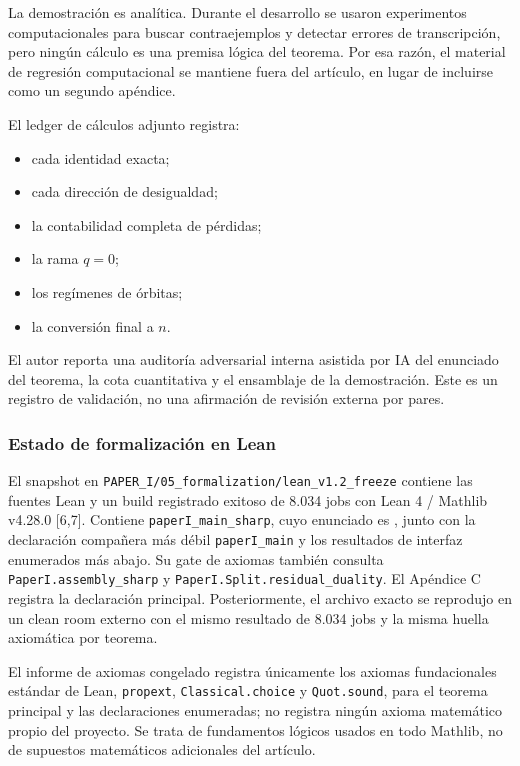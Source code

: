 \documentclass[spanish,11pt,a4paper]{article}
\providecommand{\tightlist}{\setlength{\itemsep}{0pt}\setlength{\parskip}{0pt}}
\begin{document}
La demostración es analítica. Durante el desarrollo se usaron
experimentos computacionales para buscar contraejemplos y detectar
errores de transcripción, pero ningún cálculo es una premisa lógica del
teorema. Por esa razón, el material de regresión computacional se
mantiene fuera del artículo, en lugar de incluirse como un segundo
apéndice.

El ledger de cálculos adjunto registra:

\begin{itemize}
\tightlist
\item
  cada identidad exacta;
\item
  cada dirección de desigualdad;
\item
  la contabilidad completa de pérdidas;
\item
  la rama \(q=0\);
\item
  los regímenes de órbitas;
\item
  la conversión final a \(n\).
\end{itemize}

El autor reporta una auditoría adversarial interna asistida por IA del
enunciado del teorema, la cota cuantitativa y el ensamblaje de la
demostración. Este es un registro de validación, no una afirmación de
revisión externa por pares.

\subsubsection{Estado de formalización en
Lean}\label{estado-de-formalizaciuxf3n-en-lean}

El snapshot en \nolinkurl{PAPER_I/05_formalization/lean_v1.2_freeze}
contiene las fuentes Lean y un build registrado exitoso de 8.034 jobs
con Lean 4 / Mathlib v4.28.0 {[}6,7{]}. Contiene
\nolinkurl{paperI_main_sharp}, cuyo enunciado es
, junto con la declaración compañera
más débil \nolinkurl{paperI_main} y los resultados de interfaz enumerados
más abajo. Su gate de axiomas también consulta
\nolinkurl{PaperI.assembly_sharp} y
\nolinkurl{PaperI.Split.residual_duality}. El Apéndice C registra la
declaración principal. Posteriormente, el archivo exacto se reprodujo en
un clean room externo con el mismo resultado de 8.034 jobs y la misma
huella axiomática por teorema.

El informe de axiomas congelado registra únicamente los axiomas
fundacionales estándar de Lean, \nolinkurl{propext},
\nolinkurl{Classical.choice} y \nolinkurl{Quot.sound}, para el teorema
principal y las declaraciones enumeradas; no registra ningún axioma
matemático propio del proyecto. Se trata de fundamentos lógicos usados
en todo Mathlib, no de supuestos matemáticos adicionales del artículo.
\end{document}
